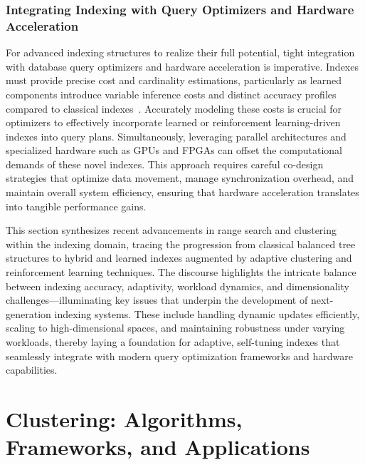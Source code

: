 \documentclass[sigconf]{acmart}
\begin{document}
\subsubsection{Integrating Indexing with Query Optimizers and Hardware Acceleration}

For advanced indexing structures to realize their full potential, tight integration with database query optimizers and hardware acceleration is imperative. Indexes must provide precise cost and cardinality estimations, particularly as learned components introduce variable inference costs and distinct accuracy profiles compared to classical indexes~\cite{ref31,ref34}. Accurately modeling these costs is crucial for optimizers to effectively incorporate learned or reinforcement learning-driven indexes into query plans. Simultaneously, leveraging parallel architectures and specialized hardware such as GPUs and FPGAs can offset the computational demands of these novel indexes. This approach requires careful co-design strategies that optimize data movement, manage synchronization overhead, and maintain overall system efficiency, ensuring that hardware acceleration translates into tangible performance gains.

This section synthesizes recent advancements in range search and clustering within the indexing domain, tracing the progression from classical balanced tree structures to hybrid and learned indexes augmented by adaptive clustering and reinforcement learning techniques. The discourse highlights the intricate balance between indexing accuracy, adaptivity, workload dynamics, and dimensionality challenges—illuminating key issues that underpin the development of next-generation indexing systems. These include handling dynamic updates efficiently, scaling to high-dimensional spaces, and maintaining robustness under varying workloads, thereby laying a foundation for adaptive, self-tuning indexes that seamlessly integrate with modern query optimization frameworks and hardware capabilities.

\section{Clustering: Algorithms, Frameworks, and Applications}
\end{document}

